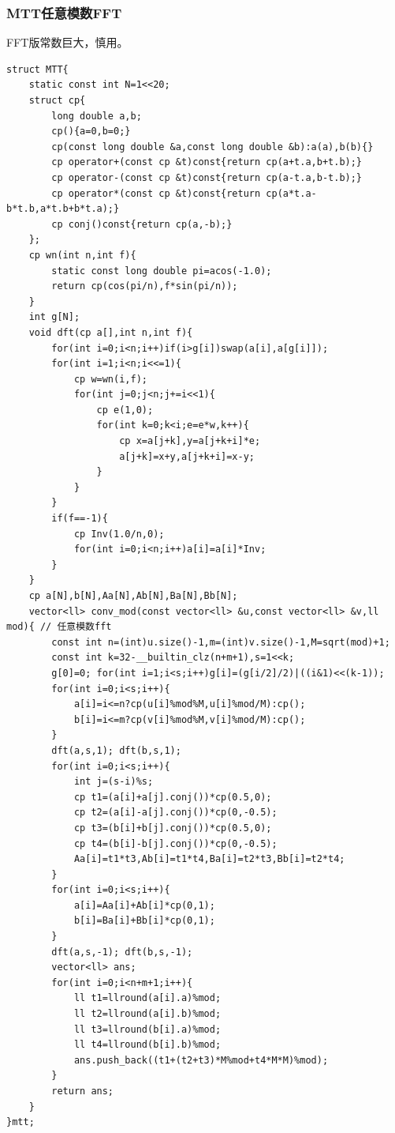 \documentclass[a4]{ctexart}
\begin{document}
\subsubsection{MTT任意模数FFT}
FFT版常数巨大，慎用。
\begin{lstlisting}
struct MTT{
    static const int N=1<<20;
    struct cp{
        long double a,b;
        cp(){a=0,b=0;}
        cp(const long double &a,const long double &b):a(a),b(b){}
        cp operator+(const cp &t)const{return cp(a+t.a,b+t.b);}
        cp operator-(const cp &t)const{return cp(a-t.a,b-t.b);}
        cp operator*(const cp &t)const{return cp(a*t.a-b*t.b,a*t.b+b*t.a);}
        cp conj()const{return cp(a,-b);}
    };
    cp wn(int n,int f){
        static const long double pi=acos(-1.0);
        return cp(cos(pi/n),f*sin(pi/n));
    }
    int g[N];
    void dft(cp a[],int n,int f){
        for(int i=0;i<n;i++)if(i>g[i])swap(a[i],a[g[i]]);
        for(int i=1;i<n;i<<=1){
            cp w=wn(i,f);
            for(int j=0;j<n;j+=i<<1){
                cp e(1,0);
                for(int k=0;k<i;e=e*w,k++){
                    cp x=a[j+k],y=a[j+k+i]*e;
                    a[j+k]=x+y,a[j+k+i]=x-y;
                }
            }
        }
        if(f==-1){
            cp Inv(1.0/n,0);
            for(int i=0;i<n;i++)a[i]=a[i]*Inv;
        }
    }
    cp a[N],b[N],Aa[N],Ab[N],Ba[N],Bb[N];
    vector<ll> conv_mod(const vector<ll> &u,const vector<ll> &v,ll mod){ // 任意模数fft
        const int n=(int)u.size()-1,m=(int)v.size()-1,M=sqrt(mod)+1;
        const int k=32-__builtin_clz(n+m+1),s=1<<k;
        g[0]=0; for(int i=1;i<s;i++)g[i]=(g[i/2]/2)|((i&1)<<(k-1));
        for(int i=0;i<s;i++){
            a[i]=i<=n?cp(u[i]%mod%M,u[i]%mod/M):cp();
            b[i]=i<=m?cp(v[i]%mod%M,v[i]%mod/M):cp();
        }
        dft(a,s,1); dft(b,s,1);
        for(int i=0;i<s;i++){
            int j=(s-i)%s;
            cp t1=(a[i]+a[j].conj())*cp(0.5,0);
            cp t2=(a[i]-a[j].conj())*cp(0,-0.5);
            cp t3=(b[i]+b[j].conj())*cp(0.5,0);
            cp t4=(b[i]-b[j].conj())*cp(0,-0.5);
            Aa[i]=t1*t3,Ab[i]=t1*t4,Ba[i]=t2*t3,Bb[i]=t2*t4;
        }
        for(int i=0;i<s;i++){
            a[i]=Aa[i]+Ab[i]*cp(0,1);
            b[i]=Ba[i]+Bb[i]*cp(0,1);
        }
        dft(a,s,-1); dft(b,s,-1);
        vector<ll> ans;
        for(int i=0;i<n+m+1;i++){
            ll t1=llround(a[i].a)%mod;
            ll t2=llround(a[i].b)%mod;
            ll t3=llround(b[i].a)%mod;
            ll t4=llround(b[i].b)%mod;
            ans.push_back((t1+(t2+t3)*M%mod+t4*M*M)%mod);
        }
        return ans;
    }
}mtt;
\end{lstlisting}
\end{document}
